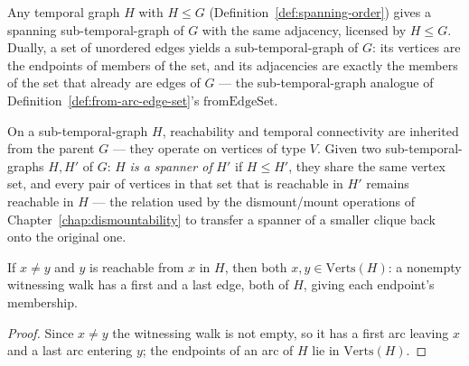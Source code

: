 \begin{definition}
  \label{def:subgraph-toSubgraph-fromEdgeSet}
  \leanok
  Any temporal graph $H$ with $H \le G$ (Definition~\ref{def:spanning-order})
  gives a spanning sub-temporal-graph of $G$ with the same adjacency,
  licensed by $H \le G$. Dually, a set of unordered edges yields a
  sub-temporal-graph of $G$: its vertices are the endpoints of members of
  the set, and its adjacencies are exactly the members of the set that
  already are edges of $G$ — the sub-temporal-graph analogue of
  Definition~\ref{def:from-arc-edge-set}'s $\mathrm{fromEdgeSet}$.
\end{definition}

\begin{definition}
  \label{def:subgraph-reachable-tc-spannerOf}
  \leanok
  On a sub-temporal-graph $H$, reachability and temporal connectivity are
  inherited from the parent $G$ — they operate on vertices of type $V$. Given
  two sub-temporal-graphs $H, H'$ of $G$: $H$ \emph{is a spanner of} $H'$
  if $H \le H'$, they share the same vertex set, and every pair of vertices
  in that set that is reachable in $H'$ remains reachable in $H$ — the
  relation used by the dismount/mount operations of
  Chapter~\ref{chap:dismountability} to transfer a spanner of a smaller
  clique back onto the original one.
\end{definition}

\begin{lemma}
  \label{lem:subgraph-mem-verts-of-reachable}
  \leanok
  If $x \neq y$ and $y$ is reachable from $x$ in $H$, then both
  $x, y \in \mathrm{Verts}(H)$: a nonempty witnessing walk has a first and a
  last edge, both of $H$, giving each endpoint's membership.
\end{lemma}

\begin{proof}
  \leanok
  Since $x \neq y$ the witnessing walk is not empty, so it has a first arc leaving $x$ and a last arc entering $y$; the endpoints of an arc of $H$ lie in $\mathrm{Verts}(H)$.
\end{proof}

